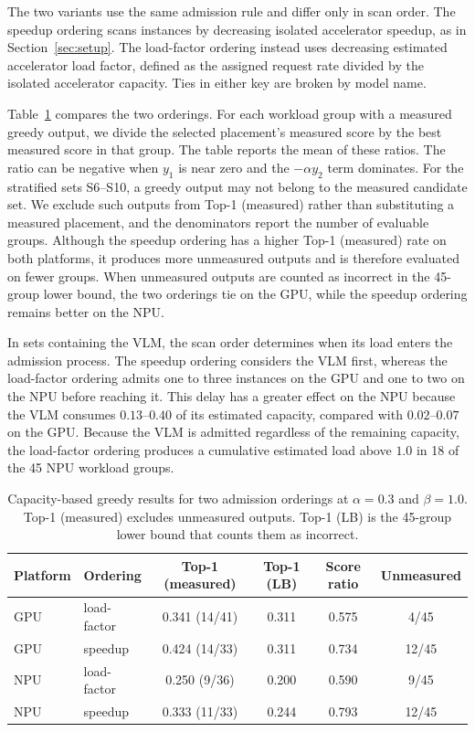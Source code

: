\documentclass{article}
\begin{document}
The two variants use the same admission rule and differ only in scan order. The speedup ordering scans instances by decreasing isolated accelerator speedup, as in Section~\ref{sec:setup}. The load-factor ordering instead uses decreasing estimated accelerator load factor, defined as the assigned request rate divided by the isolated accelerator capacity. Ties in either key are broken by model name.

Table~\ref{tab:app_greedy} compares the two orderings. For each workload group with a measured greedy output, we divide the selected placement's measured score by the best measured score in that group. The table reports the mean of these ratios. The ratio can be negative when $y_1$ is near zero and the $-\alpha y_2$ term dominates. For the stratified sets S6--S10, a greedy output may not belong to the measured candidate set. We exclude such outputs from Top-1 (measured) rather than substituting a measured placement, and the denominators report the number of evaluable groups. Although the speedup ordering has a higher Top-1 (measured) rate on both platforms, it produces more unmeasured outputs and is therefore evaluated on fewer groups. When unmeasured outputs are counted as incorrect in the 45-group lower bound, the two orderings tie on the GPU, while the speedup ordering remains better on the NPU.

In sets containing the VLM, the scan order determines when its load enters the admission process. The speedup ordering considers the VLM first, whereas the load-factor ordering admits one to three instances on the GPU and one to two on the NPU before reaching it. This delay has a greater effect on the NPU because the VLM consumes $0.13$--$0.40$ of its estimated capacity, compared with $0.02$--$0.07$ on the GPU. Because the VLM is admitted regardless of the remaining capacity, the load-factor ordering produces a cumulative estimated load above $1.0$ in 18 of the 45 NPU workload groups.

\begin{table}[h]
\centering
\caption{Capacity-based greedy results for two admission orderings at $\alpha{=}0.3$ and $\beta{=}1.0$. Top-1 (measured) excludes unmeasured outputs. Top-1 (LB) is the 45-group lower bound that counts them as incorrect.}
\label{tab:app_greedy}
\footnotesize
\begin{tabular}{@{}ll ccc c@{}}
\toprule
Platform & Ordering & Top-1 (measured) & Top-1 (LB) & Score ratio & Unmeasured \\
\midrule
GPU & load-factor & 0.341 (14/41) & 0.311 & 0.575 & 4/45 \\
GPU & speedup     & 0.424 (14/33) & 0.311 & 0.734 & 12/45 \\
NPU & load-factor & 0.250 (9/36)  & 0.200 & 0.590 & 9/45 \\
NPU & speedup     & 0.333 (11/33) & 0.244 & 0.793 & 12/45 \\
\bottomrule
\end{tabular}
\end{table}
\end{document}
